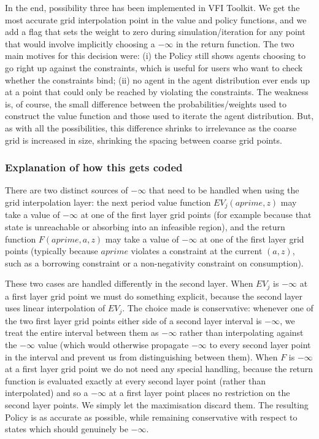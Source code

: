 \documentclass[11pt,fleqn]{article}
\begin{document}
In the end, possibility three has been implemented in VFI Toolkit. We get the most accurate grid interpolation point in the value and policy functions, and we add a flag that sets the weight to zero during simulation/iteration for any point that would involve implicitly choosing a $-\infty$ in the return function. The two main motives for this decision were: (i) the Policy still shows agents choosing to go right up against the constraints, which is useful for users who want to check whether the constraints bind; (ii) no agent in the agent distribution ever ends up at a point that could only be reached by violating the constraints. The weakness is, of course, the small difference between the probabilities/weights used to construct the value function and those used to iterate the agent distribution. But, as with all the possibilities, this difference shrinks to irrelevance as the coarse grid is increased in size, shrinking the spacing between coarse grid points.


\subsubsection*{Explanation of how this gets coded}
There are two distinct sources of $-\infty$ that need to be handled when using the grid interpolation layer: the next period value function $EV_j(aprime,z)$ may take a value of $-\infty$ at one of the first layer grid points (for example because that state is unreachable or absorbing into an infeasible region), and the return function $F(aprime,a,z)$ may take a value of $-\infty$ at one of the first layer grid points (typically because $aprime$ violates a constraint at the current $(a,z)$, such as a borrowing constraint or a non-negativity constraint on consumption).

These two cases are handled differently in the second layer. When $EV_j$ is $-\infty$ at a first layer grid point we must do something explicit, because the second layer uses linear interpolation of $EV_j$. The choice made is conservative: whenever one of the two first layer grid points either side of a second layer interval is $-\infty$, we treat the entire interval between them as $-\infty$ rather than interpolating against the $-\infty$ value (which would otherwise propagate $-\infty$ to every second layer point in the interval and prevent us from distinguishing between them). When $F$ is $-\infty$ at a first layer grid point we do not need any special handling, because the return function is evaluated exactly at every second layer point (rather than interpolated) and so a $-\infty$ at a first layer point places no restriction on the second layer points. We simply let the maximisation discard them. The resulting Policy is as accurate as possible, while remaining conservative with respect to states which should genuinely be $-\infty$.
\end{document}
